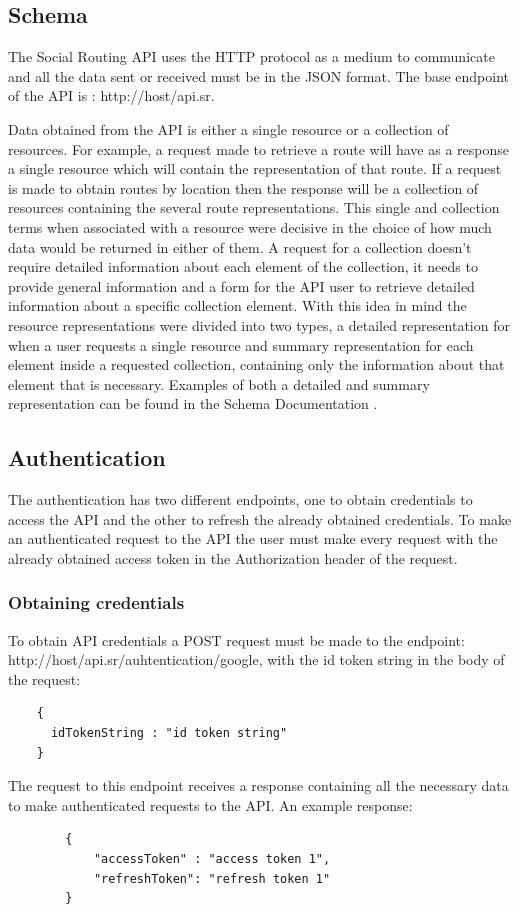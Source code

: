     \subsection{Schema} 
        The Social Routing API uses the HTTP protocol as a medium to communicate and all the data sent or received must be in the JSON format.
        The base endpoint of the API is : http://host/api.sr.\par
        Data obtained from the API is either a single resource or a collection of resources. For example, a request
        made to retrieve a route will have as a response a single resource which will contain the representation of that
        route. If a request is made to obtain routes by location then the response will be a collection of resources containing
        the several route representations. This single and collection terms when associated with a
        resource were decisive in the choice of how much data would be returned in either of them. A request for a collection
        doesn't require detailed information about each element of the collection, it needs to provide general information and
        a form for the API user to retrieve detailed information about a specific collection element.
        With this idea in mind the resource representations were divided into two types, a detailed representation for when a user
        requests a single resource and summary representation for each element inside a requested collection, containing only the 
        information about that element that is necessary.
        Examples of both a detailed and summary representation can be found in the Schema Documentation \cite{schemadocs}.    
    
    
    \subsection{Authentication} \label{authsection}
    The authentication has two different endpoints, one to obtain credentials to access the API and the other to refresh 
    the already obtained credentials. To make an authenticated request to the API the user must make every request with 
    the already obtained access token in the Authorization header of the request.
    
    \subsubsection*{Obtaining credentials} \label{apiobtcred}
    To obtain API credentials a POST \cite{httppostdocs} request must be made to the endpoint: http://host/api.sr/auhtentication/google, 
    with the id token string in the body of the request:
    \begin{lstlisting}
    {
      idTokenString : "id token string"
    }
     \end{lstlisting}
    The request to this endpoint receives a response containing all the necessary data to make authenticated requests to the API.
    An example response:
    \begin{lstlisting}
        {
            "accessToken" : "access token 1",
            "refreshToken": "refresh token 1"
        }
    \end{lstlisting}

